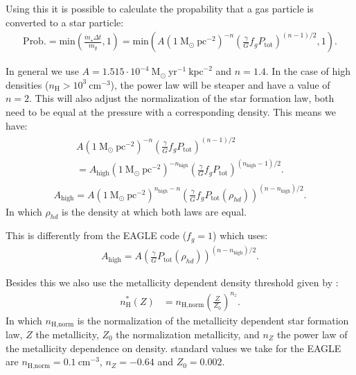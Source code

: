\noindent Using this it is possible to calculate the propability that a gas particle is 
converted to a star particle:
\begin{align}
 \text{Prob.} = \text{min} \left( \frac{\dot{m}_\star \Delta t}{m_g}, 1 \right) 
 = \text{min} \left( A \left( 1 ~\text{M}_\odot ~\text{pc}^{-2} \right)^{-n} \left( \frac{\gamma}{G} f_g P_\text{tot} \right)^{(n-1)/2}, 1 \right).
\end{align}

\noindent In general we use $A=1.515 \cdot 10^{-4}~\text{M}_\odot ~\text{yr}^{-1} ~\text{kpc}^{-2}$ 
and $n=1.4$. In the case of high densities ($n_\text{H} > 10^3 ~\text{cm}^{-3}$),
the power law will be steaper and have a value of $n=2$. This will also adjust
the normalization of the star formation law, both need to be equal at the 
pressure with a corresponding density. This means we have:
\begin{align}
\begin{split}
 A \left( 1 ~\text{M}_\odot ~\text{pc}^{-2} \right)^{-n} \left( \frac{\gamma}{G} f_g P_\text{tot} \right)^{(n-1)/2} \\
 = A_\text{high} \left( 1 ~\text{M}_\odot ~\text{pc}^{-2} \right)^{-n_\text{high}} \left( \frac{\gamma}{G} f_g P_\text{tot} \right)^{(n_\text{high}-1)/2}. 
\end{split}
\end{align}
\begin{align}
A_\text{high} = A \left( 1 ~\text{M}_\odot ~\text{pc}^{-2} \right)^{n_\text{high}-n} \left( \frac{\gamma}{G} f_g P_\text{tot}(\rho_{hd}) \right)^{(n-n_\text{high})/2}. 
\end{align}
In which $\rho_{hd}$ is the density at which both laws are equal.

This is differently from the EAGLE code ($f_g=1$) which uses:
\begin{align}
A_\text{high} = A \left( \frac{\gamma}{G} P_\text{tot} (\rho_{hd}) \right)^{(n-n_\text{high})/2} . 
\end{align}

Besides this we also use the metallicity dependent density threshold given by \citep{schaye2004}:
\begin{align}
n^*_\text{H} (Z) &= n_\text{H,norm} \left( \frac{Z}{Z_0} \right)^{n_z}.
\end{align}
In which $n_\text{H,norm}$ is the normalization of the metallicity dependent 
star formation law, $Z$ the metallicity, $Z_0$ the normalization metallicity,
and $n_Z$ the power law of the metallicity dependence on density. standard 
values we take for the EAGLE are $n_\text{H,norm} = 0.1 ~\text{cm}^{-3}$, 
$n_Z=-0.64$ and $Z_0 = 0.002$.

